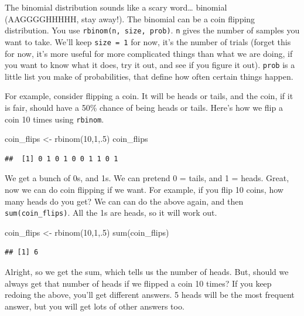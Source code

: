 \documentclass[
]{book}
\newenvironment{Shaded}{\begin{snugshade}}{\end{snugshade}}
\newcommand{\DecValTok}[1]{\textcolor[rgb]{0.00,0.00,0.81}{#1}}
\newcommand{\FunctionTok}[1]{\textcolor[rgb]{0.00,0.00,0.00}{#1}}
\newcommand{\NormalTok}[1]{#1}
\newcommand{\OtherTok}[1]{\textcolor[rgb]{0.56,0.35,0.01}{#1}}
\begin{document}
The binomial distribution sounds like a scary word\ldots{} binomial (AAGGGGHHHHH, stay away!). The binomial can be a coin flipping distribution. You use \texttt{rbinom(n,\ size,\ prob)}. \texttt{n} gives the number of samples you want to take. We'll keep \texttt{size\ =\ 1} for now, it's the number of trials (forget this for now, it's more useful for more complicated things than what we are doing, if you want to know what it does, try it out, and see if you figure it out). \texttt{prob} is a little list you make of probabilities, that define how often certain things happen.

For example, consider flipping a coin. It will be heads or tails, and the coin, if it is fair, should have a 50\% chance of being heads or tails. Here's how we flip a coin 10 times using \texttt{rbinom}.

\begin{Shaded}
\begin{Highlighting}[]
\NormalTok{coin\_flips }\OtherTok{\textless{}{-}} \FunctionTok{rbinom}\NormalTok{(}\DecValTok{10}\NormalTok{,}\DecValTok{1}\NormalTok{,.}\DecValTok{5}\NormalTok{)}
\NormalTok{coin\_flips}
\end{Highlighting}
\end{Shaded}

\begin{verbatim}
##  [1] 0 1 0 1 0 0 1 1 0 1
\end{verbatim}

We get a bunch of 0s, and 1s. We can pretend 0 = tails, and 1 = heads. Great, now we can do coin flipping if we want. For example, if you flip 10 coins, how many heads do you get? We can can do the above again, and then \texttt{sum(coin\_flips)}. All the 1s are heads, so it will work out.

\begin{Shaded}
\begin{Highlighting}[]
\NormalTok{coin\_flips }\OtherTok{\textless{}{-}} \FunctionTok{rbinom}\NormalTok{(}\DecValTok{10}\NormalTok{,}\DecValTok{1}\NormalTok{,.}\DecValTok{5}\NormalTok{)}
\FunctionTok{sum}\NormalTok{(coin\_flips)}
\end{Highlighting}
\end{Shaded}

\begin{verbatim}
## [1] 6
\end{verbatim}

Alright, so we get the sum, which tells us the number of heads. But, should we always get that number of heads if we flipped a coin 10 times? If you keep redoing the above, you'll get different answers. 5 heads will be the most frequent answer, but you will get lots of other answers too.
\end{document}
